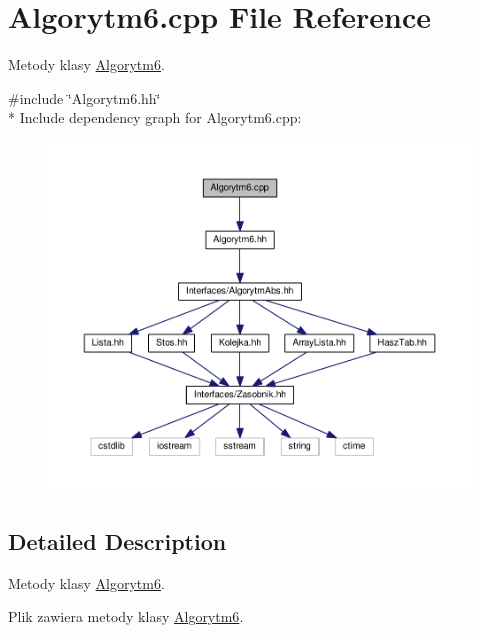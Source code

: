 \hypertarget{a00028}{}\section{Algorytm6.\+cpp File Reference}
\label{a00028}


Metody klasy \hyperlink{a00007}{Algorytm6}.  


{\ttfamily \#include \char`\"{}Algorytm6.\+hh\char`\"{}}\\*
Include dependency graph for Algorytm6.\+cpp\+:
\nopagebreak
\begin{figure}[H]
\begin{center}
\leavevmode
\includegraphics[width=350pt]{a00068}
\end{center}
\end{figure}


\subsection{Detailed Description}
Metody klasy \hyperlink{a00007}{Algorytm6}. 

Plik zawiera metody klasy \hyperlink{a00007}{Algorytm6}. 